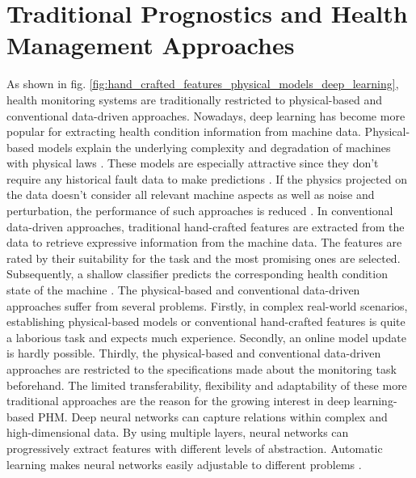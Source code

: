 \section{Traditional Prognostics and Health Management Approaches}
As shown in fig. \ref{fig:hand_crafted_features_physical_models_deep_learning}, health monitoring systems are traditionally restricted to physical-based and conventional data-driven approaches. Nowadays, deep learning has become more popular for extracting health condition information from machine data. Physical-based models explain the underlying complexity and degradation of machines with physical laws \cite{ZHAO2019213}. These models are especially attractive since they don't require any historical fault data to make predictions \cite{Benker2019}. If the physics projected on the data doesn't consider all relevant machine aspects as well as noise and perturbation, the performance of such approaches is reduced \cite{ZHAO2019213}. In conventional data-driven approaches, traditional hand-crafted features are extracted from the data to retrieve expressive information from the machine data. The features are rated by their suitability for the task and the most promising ones are selected. Subsequently, a shallow classifier predicts the corresponding health condition state of the machine \cite{ZHAO2019213}. The physical-based and conventional data-driven approaches suffer from several problems. Firstly, in complex real-world scenarios, establishing physical-based models or conventional hand-crafted features is quite a laborious task and expects much experience. Secondly, an online model update is hardly possible. Thirdly, the physical-based and conventional data-driven approaches are restricted to the specifications made about the monitoring task beforehand. The limited transferability, flexibility and adaptability of these more traditional approaches are the reason for the growing interest in deep learning-based PHM. Deep neural networks can capture relations within complex and high-dimensional data. By using multiple layers, neural networks can progressively extract features with different levels of abstraction. Automatic learning makes neural networks easily adjustable to different problems \cite{ZHAO2019213}.
